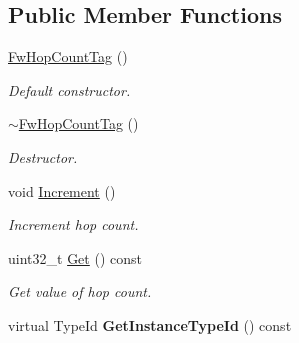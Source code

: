 \subsection*{Public Member Functions}
\begin{DoxyCompactItemize}
\item 
\hyperlink{classns3_1_1ndn_1_1FwHopCountTag_afefe711583770d07b712bf8b799ac66d}{Fw\+Hop\+Count\+Tag} ()\hypertarget{classns3_1_1ndn_1_1FwHopCountTag_afefe711583770d07b712bf8b799ac66d}{}\label{classns3_1_1ndn_1_1FwHopCountTag_afefe711583770d07b712bf8b799ac66d}

\begin{DoxyCompactList}\small\item\em Default constructor. \end{DoxyCompactList}\item 
\hyperlink{classns3_1_1ndn_1_1FwHopCountTag_a4bdb9a8289b8e74b47561b6c2b95b051}{$\sim$\+Fw\+Hop\+Count\+Tag} ()\hypertarget{classns3_1_1ndn_1_1FwHopCountTag_a4bdb9a8289b8e74b47561b6c2b95b051}{}\label{classns3_1_1ndn_1_1FwHopCountTag_a4bdb9a8289b8e74b47561b6c2b95b051}

\begin{DoxyCompactList}\small\item\em Destructor. \end{DoxyCompactList}\item 
void \hyperlink{classns3_1_1ndn_1_1FwHopCountTag_ac864c738ffeb3aac80efdb22987ce4d2}{Increment} ()\hypertarget{classns3_1_1ndn_1_1FwHopCountTag_ac864c738ffeb3aac80efdb22987ce4d2}{}\label{classns3_1_1ndn_1_1FwHopCountTag_ac864c738ffeb3aac80efdb22987ce4d2}

\begin{DoxyCompactList}\small\item\em Increment hop count. \end{DoxyCompactList}\item 
uint32\+\_\+t \hyperlink{classns3_1_1ndn_1_1FwHopCountTag_a8fe517771e05fac1af5bacf2303999d6}{Get} () const\hypertarget{classns3_1_1ndn_1_1FwHopCountTag_a8fe517771e05fac1af5bacf2303999d6}{}\label{classns3_1_1ndn_1_1FwHopCountTag_a8fe517771e05fac1af5bacf2303999d6}

\begin{DoxyCompactList}\small\item\em Get value of hop count. \end{DoxyCompactList}\item 
virtual Type\+Id {\bfseries Get\+Instance\+Type\+Id} () const\hypertarget{classns3_1_1ndn_1_1FwHopCountTag_a3735532d5f8ba5d38462a49b43e3a3cd}{}\label{classns3_1_1ndn_1_1FwHopCountTag_a3735532d5f8ba5d38462a49b43e3a3cd}


\end{DoxyCompactItemize}
